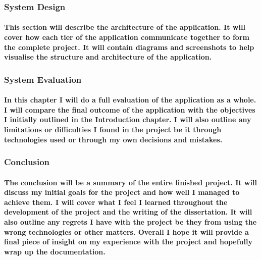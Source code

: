     \subsubsection{System Design}
    \paragraph{This section will describe the architecture of the application. It will cover how each tier of the application communicate together to form the complete project. It will contain diagrams and screenshots to help visualise the structure and architecture of the application.}
    \subsubsection{System Evaluation}
    \paragraph{In this chapter I will do a full evaluation of the application as a whole. I will compare the final outcome of the application with the objectives I initially outlined in the Introduction chapter. I will also outline any limitations or difficulties I found in the project be it through technologies used or through my own decisions and mistakes.}
    \subsubsection{Conclusion}
    \paragraph{The conclusion will be a summary of the entire finished project. It will discuss my initial goals for the project and how well I managed to achieve them. I will cover what I feel I learned throughout the development of the project and the writing of the dissertation. It will also outline any regrets I have with the project be they from using the wrong technologies or other matters. Overall I hope it will provide a final piece of insight on my experience with the project and hopefully wrap up the documentation.}
